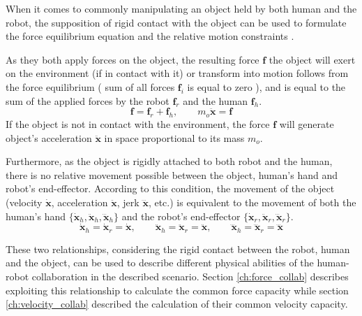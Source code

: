 When it comes to commonly manipulating an object held by both human and the robot, the supposition of rigid contact with the object can be used to formulate the force equilibrium equation and the relative motion constraints \cite{Prattichizzo2016}. 

As they both apply forces on the object, the resulting force $\bm{f}$ the object will exert on the environment (if in contact with it) or transform into motion follows from the force equilibrium ( sum of all forces $\bm{f}_i$ is equal to zero ), and is equal to the sum of the applied forces by the robot $\bm{f}_r$ and the human $\bm{f}_h$. 
\begin{equation}
    \bm{f} = \bm{f}_r + \bm{f}_h, \qquad  m_o\ddot{\bm{x}} = \bm{f} 
\end{equation}
If the object is not in contact with the environment, the force $\bm{f}$ will generate object's acceleration $\ddot{\bm{x}}$  in space proportional to its mass $m_o$.

Furthermore, as the object is rigidly attached to both robot and the human, there is no relative movement possible between the object, human's hand and robot's end-effector. According to this condition, the movement of the object (velocity $\dot{\bm{x}}$, acceleration $\ddot{\bm{x}}$, jerk $\dddot{\bm{x}}$, etc.) is equivalent to the movement of both the human's hand $\{\dot{\bm{x}}_h,\ddot{\bm{x}}_h,\dddot{\bm{x}}_h\}$ and the robot's end-effector $\{\dot{\bm{x}}_r,\ddot{\bm{x}}_r,\dddot{\bm{x}}_r\}$.
\begin{equation}
    \dot{\bm{x}}_h=\dot{\bm{x}}_r=\dot{\bm{x}}, \qquad
    \ddot{\bm{x}}_h=\ddot{\bm{x}}_r=\ddot{\bm{x}}, \qquad
    \dddot{\bm{x}}_h=\dddot{\bm{x}}_r=\dddot{\bm{x}}
    \label{eq:kinematic_condition_contact}
\end{equation}

These two relationships, considering the rigid contact between the robot, human and the object, can be used to describe different physical abilities of the human-robot collaboration in the described scenario. Section \ref{ch:force_collab} describes exploiting this relationship to calculate the common force capacity while section \ref{ch:velocity_collab} described the calculation of their common velocity capacity.




